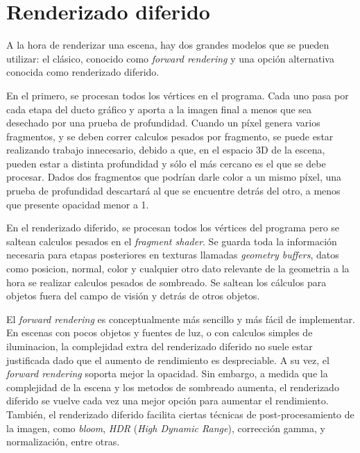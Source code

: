 \section{Renderizado diferido}\label{sec:deferred-rendering}

A la hora de renderizar una escena, hay dos grandes modelos que se pueden utilizar: el clásico, conocido como \textit{forward rendering} y una opción alternativa conocida como renderizado diferido.

En el primero, se procesan todos los vértices en el programa.
Cada uno pasa por cada etapa del ducto gráfico y aporta a la imagen final a menos que sea desechado por una prueba de profundidad.
Cuando un píxel genera varios fragmentos, y se deben correr calculos pesados por fragmento, se puede estar realizando trabajo innecesario, debido a que, en el espacio 3D de la escena, pueden estar a distinta profundidad y sólo el más cercano es el que se debe procesar.
Dados dos fragmentos que podrían darle color a un mismo píxel, una prueba de profundidad descartará al que se encuentre detrás del otro, a menos que presente opacidad menor a 1.

En el renderizado diferido, se procesan todos los vértices del programa pero se saltean calculos pesados en el \textit{fragment shader}.
Se guarda toda la información necesaria para etapas posteriores en texturas llamadas \textit{geometry buffers}, datos como posicion, normal, color y cualquier otro dato relevante de la geometria a la hora se realizar calculos pesados de sombreado.
Se saltean los cálculos para objetos fuera del campo de visión y detrás de otros objetos.

El \textit{forward rendering} es conceptualmente más sencillo y más fácil de implementar.
En escenas con pocos objetos y fuentes de luz, o con calculos simples de iluminacion, la complejidad extra del renderizado diferido no suele estar justificada dado que el aumento de rendimiento es despreciable.
A su vez, el \textit{forward rendering} soporta mejor la opacidad.
Sin embargo, a medida que la complejidad de la escena y los metodos de sombreado aumenta, el renderizado diferido se vuelve cada vez una mejor opción para aumentar el rendimiento.
También, el renderizado diferido facilita ciertas técnicas de post-procesamiento de la imagen, como \textit{bloom}, \textit{HDR} (\textit{High Dynamic Range}), corrección gamma, y normalización, entre otras.


